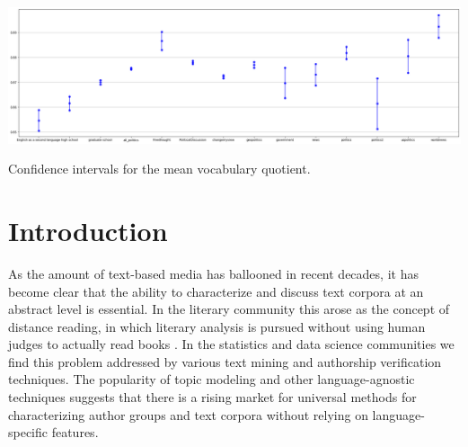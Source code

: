 \documentclass[sigconf]{acmart}
\begin{document}



\begin{teaserfigure}
  \centering
  \includegraphics[width=\textwidth]{images/confidenceintervals}
  \caption{Confidence intervals for the mean vocabulary quotient.}
  \label{fig:teaser}
\end{teaserfigure}

\maketitle

\section{Introduction}

As the amount of text-based media has ballooned in recent decades, it has
become clear that the ability to characterize and discuss text corpora at an
abstract level is essential. In the literary community this arose as the
concept of distance reading, in which literary analysis is pursued without
using human judges to actually read books \cite{moretti2000conjectures}. In the
statistics and data science communities we find this problem addressed by
various text mining and authorship verification techniques. The popularity
of topic modeling and other language-agnostic techniques suggests that there
is a rising market for universal methods for characterizing author groups
and text corpora without relying on language-specific features. 
\end{document}

